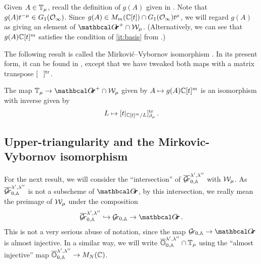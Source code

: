 \documentclass{article}
\begin{document}
Given $ A \in \mathbb T_\mu$, recall the definition of $ g(A)$ given in .  Note that $g(A)t^{-\mu} \in G_1(\mathcal O_\infty)$.
Since $ g(A) \in M_m(\mathbb C[t]) \cap G_1(\mathcal O_\infty)t^\mu$, we will regard $ g(A)$ as giving an element of $ \Grth^+ \cap \cW_\mu$.  (Alternatively, we can see that $ g(A) \mathbb C[t]^m$ satisfies the condition of \cref{it:basis} from .)

The following result is called the Mirkovi\'c--Vybornov isomorphism \cite{mirkovic2007quiver}.  In its present form, it can be found in \cite[Theorem 3.2]{cautis2018categorical}, except that we have tweaked both maps with a matrix transpose $[\phantom{A}]^{\mathrm{tr}}$.
% 

\begin{theorem} 
\label{th:TmuWmu}
The map $ \TT_\mu \rightarrow \Grth^+ \cap \cW_\mu $ given by $ A \mapsto g(A)\mathbb C[t]^m $ is an isomorphism with inverse given by
$$ 
    L \mapsto [t|_{\mathbb C[t]^m/L} ]^{\mathrm{tr}}_{\beta_\mu} \,. 
$$
\end{theorem}

\subsection{Upper-triangularity and the Mirkovic-Vybornov isomorphism}
For the next result, we will consider the ``intersection'' of $ \overline{\mathcal{G}\!r}^{\lambda', \lambda''}_{0,\mathbb A} $ with $\mathcal W_\mu$. As $  \overline{\mathcal{G}\!r}^{\lambda', \lambda''}_{0,\mathbb A} $ is not a subscheme of $ \Grth$, by this intersection, we really mean the preimage of $ \mathcal W_\mu$ under the composition
$$ 
    \overline{\Gr}^{\lambda', \lambda''}_{0,\AA}  \hookrightarrow \Grbd \rightarrow \Grth\,.
$$
This is not a very serious abuse of notation, since the map $ \Grbd \rightarrow \Grth $ is almost injective. In a similar way, we will write $ \overline{\mathbb O}^{\lambda', \lambda''}_{0,\mathbb A} \cap \mathbb T_\mu$ using the ``almost injective'' map $ \overline{\mathbb O}^{\lambda', \lambda''}_{0,\mathbb A} \rightarrow M_N(\mathbb C)$. 
\end{document}
